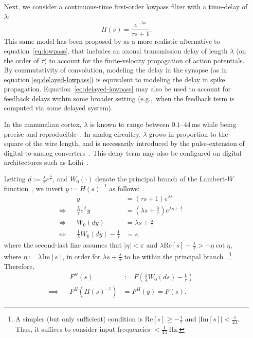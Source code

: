 Next, we consider a continuous-time first-order lowpass filter with a time-delay of $\lambda$:
\begin{equation} \label{eq:delayed-lowpass}
H(s) = \frac{e^{-\lambda s}}{\tau s + 1} \text{.}
\end{equation}
This same model has been proposed by \citet[][equation~6.2]{roth2009modeling} as a more realistic alternative to equation~\ref{eq:lowpass}, that includes an axonal transmission delay of length $\lambda$ (on the order of $\tau$) to account for the finite-velocity propagation of action potentials.
By commutativity of convolution, modeling the delay in the synapse (as in equation \ref{eq:delayed-lowpass}) is equivalent to modeling the delay in spike propagation.
Equation~\ref{eq:delayed-lowpass} may also be used to account for feedback delays within some broader setting (e.g.,~when the feedback term is computed via some delayed system).

In the mammalian cortex, $\lambda$ is known to range between $0.1$--$44$\,ms while being precise and reproducible~\citep{lagorce2015stick}.
In analog circuitry, $\lambda$ grows in proportion to the square of the wire length, and is necessarily introduced by the pulse-extension of digital-to-analog converters~\citep{voelker2017iscas}.
This delay term may also be configured on digital architectures such as Loihi~\citep{davies2018loihi}.

Letting $d := \frac{\lambda}{\tau}e^{\frac{\lambda}{\tau}}$, and $W_0(\cdot)$ denote the principal branch of the Lambert-$W$ function~\citep{corless1996lambertw}, we invert $y := H(s)^{-1}$ as follows:
\begin{align*}
&& y &= \left(\tau s + 1\right) e^{\lambda s} && \\
\iff && \frac{\lambda}{\tau}e^{\frac{\lambda}{\tau}} y &= \left( \lambda s + \frac{\lambda}{\tau} \right) e^{\lambda s + \frac{\lambda}{\tau}} && \\
\iff && W_0(dy) &= \lambda s + \frac{\lambda}{\tau} && \\
\iff && \frac{1}{\lambda} W_0(dy) - \frac{1}{\tau} &= s \text{,} &&
\end{align*}
where the second-last line assumes that $|\eta| < \pi$ and $\lambda \text{Re}\left[ s \right] + \frac{\lambda}{\tau} > - \eta \cot \eta$, where $\eta := \lambda \text{Im}\left[ s \right]$, in order for $\lambda s + \frac{\lambda}{\tau}$ to be within the principal branch~\citep[][equation~4.4]{corless1996lambertw}.\footnote{%
A simpler (but only sufficient) condition is $\text{Re} \left[ s \right] \ge -\frac{1}{\tau}$ and $ | \text{Im} \left[ s \right] | < \frac{\pi}{2 \lambda}$.
Thus, it suffices to consider input frequencies $< \frac{1}{4\lambda}$\,Hz.}
Therefore,
\begin{align}
&& F^H(s) &:= F\left( \frac{1}{\lambda} W_0(ds) - \frac{1}{\tau} \right) \label{eq:delayed-lowpass-mapped} && \\
\implies && F^H(H(s)^{-1}) &= F^H(y) = F(s) \text{.} && \nonumber
\end{align}


